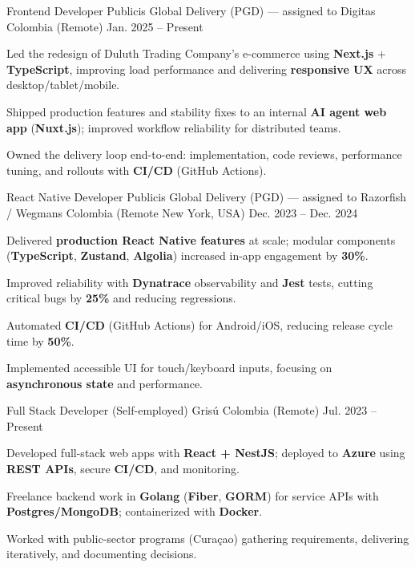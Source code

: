 \newcommand{\quotes}[1]{``#1''}

\begin{cventries}

  \cventry
  {Frontend Developer}
  {Publicis Global Delivery (PGD) — assigned to Digitas}
  {Colombia (Remote)}
  {Jan. 2025 -- Present}
  {
    \begin{cvitems}
      \item {Led the redesign of Duluth Trading Company's e-commerce using \textbf{Next.js} + \textbf{TypeScript}, improving load performance and delivering \textbf{responsive UX} across desktop/tablet/mobile.}
      \item {Shipped production features and stability fixes to an internal \textbf{AI agent web app} (\textbf{Nuxt.js}); improved workflow reliability for distributed teams.}
      \item {Owned the delivery loop end-to-end: implementation, code reviews, performance tuning, and rollouts with \textbf{CI/CD} (GitHub Actions).}
    \end{cvitems}
  }

  \cventry
  {React Native Developer}
  {Publicis Global Delivery (PGD) — assigned to Razorfish / Wegmans}
  {Colombia (Remote \textemdash{} New York, USA)}
  {Dec. 2023 -- Dec. 2024}
  {
    \begin{cvitems}
      \item {Delivered \textbf{production React Native features} at scale; modular components (\textbf{TypeScript}, \textbf{Zustand}, \textbf{Algolia}) increased in-app engagement by \textbf{30\%}.}
      \item {Improved reliability with \textbf{Dynatrace} observability and \textbf{Jest} tests, cutting critical bugs by \textbf{25\%} and reducing regressions.}
      \item {Automated \textbf{CI/CD} (GitHub Actions) for Android/iOS, reducing release cycle time by \textbf{50\%}.}
      \item {Implemented accessible UI for touch/keyboard inputs, focusing on \textbf{asynchronous state} and performance.}
    \end{cvitems}
  }

  \cventry
  {Full Stack Developer (Self-employed)}
  {Grisú}
  {Colombia (Remote)}
  {Jul. 2023 -- Present}
  {
    \begin{cvitems}
      \item {Developed full-stack web apps with \textbf{React + NestJS}; deployed to \textbf{Azure} using \textbf{REST APIs}, secure \textbf{CI/CD}, and monitoring.}
      \item {Freelance backend work in \textbf{Golang} (\textbf{Fiber}, \textbf{GORM}) for service APIs with \textbf{Postgres/MongoDB}; containerized with \textbf{Docker}.}
      \item {Worked with public-sector programs (Curaçao) gathering requirements, delivering iteratively, and documenting decisions.}
    \end{cvitems}
  }


\end{cventries}
